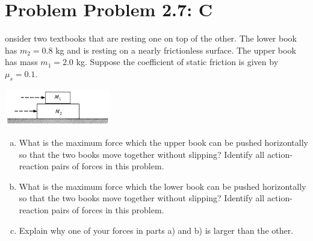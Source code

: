 \documentclass[problems]{esg8012pset}
\begin{document}
\section*{Problem Problem 2.7: C}
onsider two textbooks that are resting one on top of the other. The lower book has $m_2 = 0.8$ kg and is resting on a nearly frictionless surface. The upper book has mass $m_1 = 2.0$ kg. Suppose the coefficient of static friction is given by $\mu_s = 0.1$.
  \begin{center}\includegraphics[width=0.35\textwidth]{ps02_2}\end{center}
  \begin{enumerate}[a)]
    \item What is the maximum force which the upper book can be pushed horizontally so that the two books move together without slipping? Identify all action-reaction pairs of forces in this problem.
    \item What is the maximum force which the lower book can be pushed horizontally so that the two books move together without slipping? Identify all action-reaction pairs of forces in this problem.
    \item Explain why one of your forces in parts a) and b) is larger than the other.
  \end{enumerate}
\end{document}
